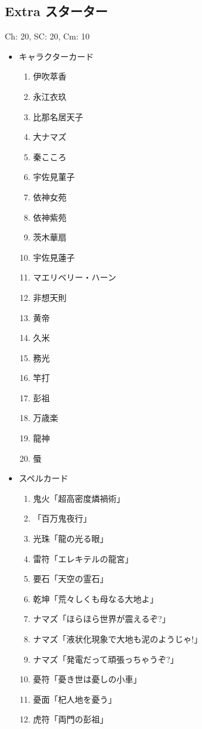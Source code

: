 \documentclass[line_length=22zw,number_of_lines=45,twocolumn]{jlreq}
\begin{document}
\subsection{Extra スターター}
Ch: 20, SC: 20, Cm: 10
\begin{itemize}
	\item キャラクターカード
		\begin{enumerate}
			\item 伊吹萃香
			\item 永江衣玖
			\item 比那名居天子
			\item 大ナマズ
			\item 秦こころ
			\item 宇佐見菫子
			\item 依神女苑
			\item 依神紫苑
			\item 茨木華扇
			\item 宇佐見蓮子
			\item マエリベリー・ハーン
			\item 非想天則
			\item 黄帝
			\item 久米
			\item 務光
			\item 竿打
			\item 彭祖
			\item 万歳楽
			\item 龍神
			\item 蜃
		\end{enumerate}
	\item スペルカード
		\begin{enumerate}
			\item 鬼火「超高密度燐禍術」
			\item 「百万鬼夜行」
			\item 光珠「龍の光る眼」
			\item 雷符「エレキテルの龍宮」
			\item 要石「天空の霊石」
			\item 乾坤「荒々しくも母なる大地よ」
			\item ナマズ「ほらほら世界が震えるぞ?」
			\item ナマズ「液状化現象で大地も泥のようじゃ!」
			\item ナマズ「発電だって頑張っちゃうぞ?」
			\item 憂符「憂き世は憂しの小車」
			\item 憂面「杞人地を憂う」
			\item 虎符「両門の彭祖」

\end{enumerate}
\end{itemize}
\end{document}
